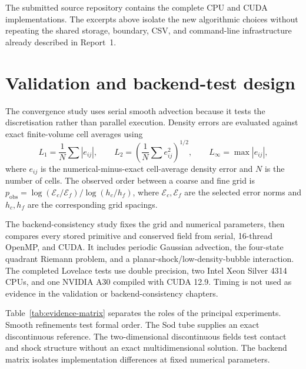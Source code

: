 The submitted source repository contains the complete CPU and CUDA implementations. The excerpts above isolate the new algorithmic choices without repeating the shared storage, boundary, CSV, and command-line infrastructure already described in Report~1.

\section{Validation and backend-test design}

The convergence study uses serial smooth advection because it tests the discretisation rather than parallel execution. Density errors are evaluated against exact finite-volume cell averages using
\begin{equation}
L_1=\frac1N\sum|e_{ij}|,\qquad
L_2=\left(\frac1N\sum e_{ij}^2\right)^{1/2},\qquad
L_\infty=\max|e_{ij}|,
\end{equation}
where \(e_{ij}\) is the numerical-minus-exact cell-average density error and
\(N\) is the number of cells. The observed order between a coarse and fine
grid is
\(p_{\mathrm{obs}}=\log(\mathcal E_c/\mathcal E_f)/
\log(h_c/h_f)\), where \(\mathcal E_c,\mathcal E_f\) are the selected error
norms and \(h_c,h_f\) are the corresponding grid spacings.

The backend-consistency study fixes the grid and numerical parameters, then compares every stored primitive and conserved field from serial, 16-thread OpenMP, and CUDA. It includes periodic Gaussian advection, the four-state quadrant Riemann problem, and a planar-shock/low-density-bubble interaction. The completed Lovelace tests use double precision, two Intel Xeon Silver 4314 CPUs, and one NVIDIA A30 compiled with CUDA 12.9. Timing is not used as evidence in the validation or backend-consistency chapters.

Table~\ref{tab:evidence-matrix} separates the roles of the principal experiments. Smooth refinements test formal order. The Sod tube supplies an exact discontinuous reference. The two-dimensional discontinuous fields test contact and shock structure without an exact multidimensional solution. The backend matrix isolates implementation differences at fixed numerical parameters.

